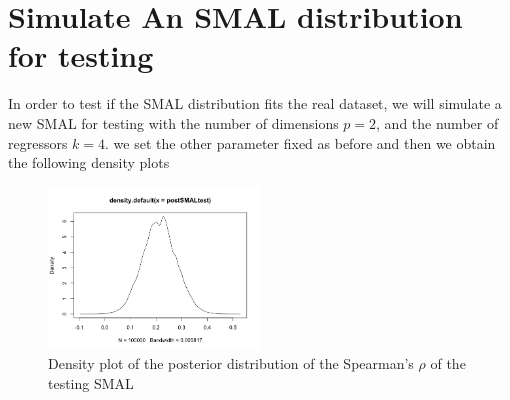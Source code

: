 \documentclass[mstat,12pt]{unswthesis}  %
\numberwithin{equation}{section}
\begin{document}
\section{Simulate An SMAL distribution for testing}
In order to test if the SMAL distribution fits the real dataset, we will simulate a new SMAL for testing with the number of dimensions $p=2$, and the number of regressors $k=4$. we set the other parameter fixed as before and then we obtain the following density plots
\begin{figure}[H]
\centering
\includegraphics[width=0.5\textwidth,height=0.4\textwidth]{postSMALtest.png}
\caption{Density plot of the posterior distribution of the Spearman's $\rho$ of the testing SMAL}
\end{figure}
\end{document}
